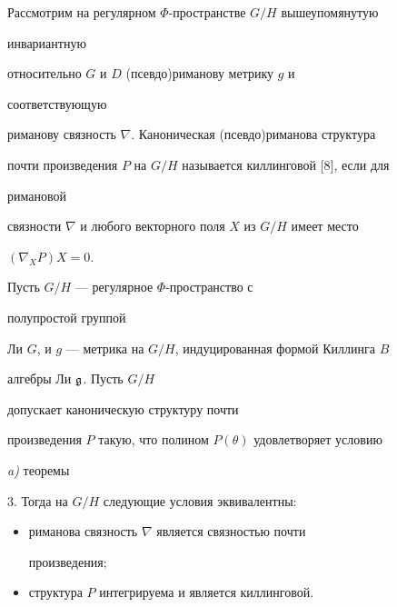  


Рассмотрим на регулярном $\Phi$-пространстве $G/H$ вышеупомянутую 


инвариантную 


относительно $G$ и $D$ (псевдо)риманову метрику $g$ и 


соответствующую 


риманову связность $\nabla$. Каноническая (псевдо)риманова структура 


почти произведения $P$ на $G/H$ называется киллинговой [8], если для 


римановой 


связности $\nabla$ и любого векторного поля $X$ из $G/H$ имеет место 


$(\nabla_XP)X\!=\!0$. 


 


\begin{thm} Пусть $G/H$ --- регулярное $\Phi$-пространство с 


полупростой группой 


Ли $G$, и $g$ --- метрика на $G/H$, индуцированная формой Киллинга $B$ 


алгебры Ли $\frak g$. Пусть $G/H$ 


допускает каноническую структуру почти 


произведения $P$ такую, что полином $P(\theta)$ удовлетворяет условию 


{\em a)} теоремы 


$3$. Тогда на $G/H$ следующие условия эквивалентны$:$ 


\begin{itemize} 


\item[1)] риманова связность $\nabla$ является связностью почти 


произведения$;$ 


\item[2)] структура $P$ интегрируема и является киллинговой. 


\end{itemize} 


\end{thm} 


 


